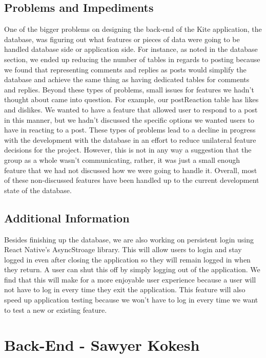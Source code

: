 \documentclass[compsoc, 10, draftclsnofoot, onecolumn]{IEEEtran}
\begin{document}
\subsection{Problems and Impediments}
One of the bigger problems on designing the back-end of the Kite application, the database, was figuring out what features or pieces of data were going to be handled database side or application side. For instance, as noted in the database section, we ended up reducing the number of tables in regards to posting because we found that representing comments and replies as posts would simplify the database and achieve the same thing as having dedicated tables for comments and replies. Beyond these types of problems, small issues for features we hadn't thought about came into question. For example, our postReaction table has likes and dislikes. We wanted to have a feature that allowed user to respond to a post in this manner, but we hadn't discussed the specific options we wanted users to have in reacting to a post. These types of problems lead to a decline in progress with the development with the database in an effort to reduce unilateral feature decisions for the project. However, this is not in any way a suggestion that the group as a whole wasn't communicating, rather, it was just a small enough feature that we had not discussed how we were going to handle it. Overall, most of these non-discussed features have been handled up to the current development state of the database.  

\subsection{Additional Information}
Besides finishing up the database, we are also working on persistent login using React Native's AsyncStroage library. This will allow users to login and stay logged in even after closing the application so they will remain logged in when they return. A user can shut this off by simply logging out of the application. We find that this will make for a more enjoyable user experience because a user will not have to log in every time they exit the application. This feature will also speed up application testing because we won't have to log in every time we want to test a new or existing feature. 

\section{Back-End - Sawyer Kokesh}
\end{document}
